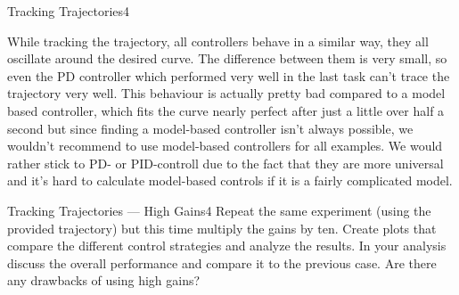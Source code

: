 \begin{questions}
\begin{question}{Tracking Trajectories}{4}
\begin{answer}
While tracking the trajectory, all controllers behave in a similar way, they all oscillate around the desired curve. The difference between them is very small, so even the PD controller which performed very well in the last task can't trace the trajectory very well. This behaviour is actually pretty bad compared to a model based controller, which fits the curve nearly perfect after just a little over half a second but since finding a model-based controller isn't always possible, we wouldn't recommend to use model-based controllers for all examples. We would rather stick to PD- or PID-controll due to the fact that they are more universal and it's hard to calculate model-based controls if it is a fairly complicated model.
\end{answer}
		
	\end{question}
	
	
	\begin{question}{Tracking Trajectories --- High Gains}{4}
		Repeat the same experiment (using the provided trajectory) but this time multiply the gains by ten. Create plots that compare the different control strategies and analyze the results. In your analysis discuss the overall performance and compare it to the previous case. Are there any drawbacks of using high gains?
		

\end{question}
\end{questions}
